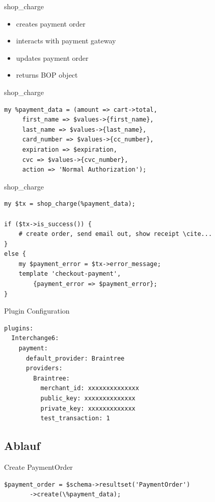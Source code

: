 \begin{frame}{shop\_charge}
\begin{itemize}
\item creates payment order
\item interacts with payment gateway
\item updates payment order
\item returns BOP object
\end{itemize}
\end{frame}

\begin{frame}[fragile]{shop\_charge}
\begin{lstlisting}
my %payment_data = (amount => cart->total,
     first_name => $values->{first_name},
     last_name => $values->{last_name},
     card_number => $values->{cc_number},
     expiration => $expiration,
     cvc => $values->{cvc_number},
     action => 'Normal Authorization');
\end{lstlisting}
\end{frame}

\begin{frame}[fragile]{shop\_charge}
\begin{lstlisting}
my $tx = shop_charge(%payment_data);

if ($tx->is_success()) {
    # create order, send email out, show receipt \cite...
}
else {
    my $payment_error = $tx->error_message;
    template 'checkout-payment', 
        {payment_error => $payment_error};
}
\end{lstlisting}
\end{frame}

\begin{frame}[fragile]{Plugin Configuration}
\begin{lstlisting}
plugins:
  Interchange6:
    payment:
      default_provider: Braintree
      providers:
        Braintree:
          merchant_id: xxxxxxxxxxxxxx
          public_key: xxxxxxxxxxxxxx
          private_key: xxxxxxxxxxxxx
          test_transaction: 1
\end{lstlisting}
\end{frame}

\subsection{Ablauf}
\begin{frame}[fragile]{Create PaymentOrder}
\begin{lstlisting}
$payment_order = $schema->resultset('PaymentOrder')
       ->create(\%payment_data);
\end{lstlisting}
\end{frame}

